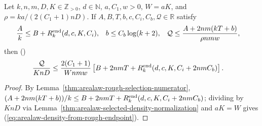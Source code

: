 \begin{lemma}
    \label{thm:arealaw-density-from-rough-endpoint}
    \leanok
    Let $k,n,m,D,K\in\mathbb Z_{>0}$, $d\in\mathbb N$, $a,C_1,w>0$, $W=aK$, and $\rho=ka/(2(C_1+1)nD)$.
    If $A,B,T,b,c,C_i,C_b,\mathcal Q\in\mathbb R$ satisfy
    \begin{align}
        \frac A k  & \leq B+R_k^{\rm end}(d,c,K,C_i),        &
        b          & \leq C_b\log(k+2),                      &
        \mathcal Q & \leq\frac{A+2nm(kT+b)}{\rho nmw},\notag
    \end{align}
    then (\cite[Section~9, lines~457--490]{OpenAI2026AreaLaw})
    \begin{align}
        \frac{\mathcal Q}{KnD}
         & \leq\frac{2(C_1+1)}{Wnmw}
        \left[B+2nmT+R_k^{\rm end}(d,c,K,C_i+2nmC_b)\right].
        \label{eq:arealaw-density-from-rough-endpoint}
    \end{align}
\end{lemma}
\begin{proof}
    \leanok
    By Lemma~\ref{thm:arealaw-rough-selection-numerator}, $(A+2nm(kT+b))/k\le B+2nmT+R_k^{\rm end}(d,c,K,C_i+2nmC_b)$; dividing by $KnD$ via Lemma~\ref{thm:arealaw-selected-density-normalization} and $aK=W$ gives (\ref{eq:arealaw-density-from-rough-endpoint}).
\end{proof}

